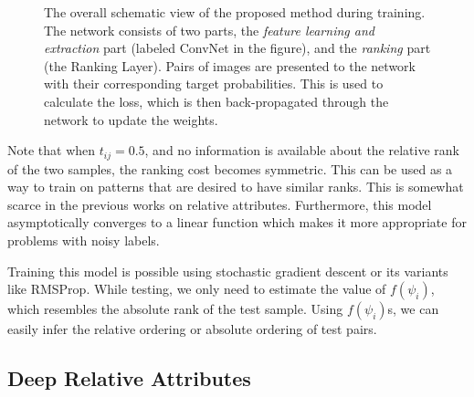 \begin{figure}
{}
\caption{The overall schematic view of the proposed method during training. The network consists of two parts, the \textit{feature learning and extraction} part (labeled ConvNet in the figure), and the \textit{ranking} part (the Ranking Layer). Pairs of images are presented to the network with their corresponding target probabilities. This is used to calculate the loss, which is then back-propagated through the network to update the weights.}
\label{fig.3}
\end{figure}


Note that when $t_{ij} = 0.5$, and no information is available about the relative rank of the two samples, the ranking cost becomes symmetric. This can be used as a way to train on patterns that are desired to have similar ranks. This is somewhat scarce in the previous works on relative attributes.
Furthermore, this model asymptotically converges to a linear function which makes it more appropriate for problems with noisy labels. %

Training this model is possible using stochastic gradient descent or its variants like RMSProp.%
While testing, we only need to estimate the value of $f(\psi_i)$, which resembles the absolute rank of the test sample. Using $f(\psi_i)$s, we can easily infer the relative ordering or absolute ordering of test pairs.


\subsection{Deep Relative Attributes}\label{sec3.2}



